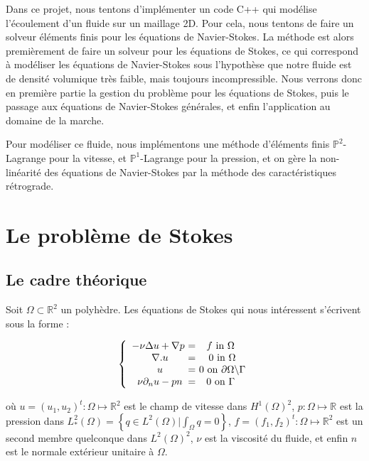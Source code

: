 \documentclass[a4paper,12pt]{article}
\begin{document}
		
 	  \setcounter{page}{1}
		
Dans ce projet, nous tentons d'implémenter un code C++ qui modélise l'écoulement d'un fluide sur un maillage 2D. Pour cela, nous tentons de faire un solveur éléments finis pour les équations de Navier-Stokes.
La méthode est alors premièrement de faire un solveur pour les équations de Stokes, ce qui correspond à modéliser les équations de Navier-Stokes sous l'hypothèse que notre fluide est de densité volumique très faible, mais toujours incompressible.
Nous verrons donc en première partie la gestion du problème pour les équations de Stokes, puis le passage aux équations de Navier-Stokes générales, et enfin l'application au domaine de la marche.

Pour modéliser ce fluide, nous implémentons une méthode d'éléments finis $\mathbb{P}^{2}$-Lagrange pour la vitesse, et $\mathbb{P}^1$-Lagrange pour la pression, et on gère la non-linéarité des équations de Navier-Stokes par la méthode des caractéristiques rétrograde.

\newpage
		
\section{Le problème de Stokes}

\subsection{Le cadre théorique}

Soit $\Omega \subset \mathbb{R}^{2}$ un polyhèdre. Les équations de Stokes qui nous intéressent s'écrivent sous la forme :

\begin{equation}
\left \{
\begin{array}{c @{ = } c}
    -\nu \Delta u + \nabla p \text{ } & f \text{ in } \Omega\\
    \nabla . u & \text{ } 0 \text{ in } \Omega\\
    u & \text{ } 0 \text{ on } \partial\Omega \backslash \Gamma\\
    \nu\partial_{n}u - pn & 0 \text{ on } \Gamma\\
\end{array}
\right.
\end{equation}

où $u = (u_{1},u_{2})^{t} : \Omega \mapsto \mathbb{R}^{2}$ est le champ de vitesse dans $H^{1}\left(\Omega\right)^{2}$, $p : \Omega \mapsto \mathbb{R}$ est la pression dans $L^{2}_{*}\left(\Omega\right) = \left \{ q \in L^{2}\left( \Omega \right) | \int_{\Omega} q = 0 \right \}$, $f = (f_{1},f_{2})^{t} : \Omega \mapsto \mathbb{R}^{2}$ est un second membre quelconque dans $L^{2}\left( \Omega \right)^{2}$, $\nu$ est la viscosité du fluide, et enfin $n$ est le normale extérieur unitaire à $\Omega$.
\end{document}

